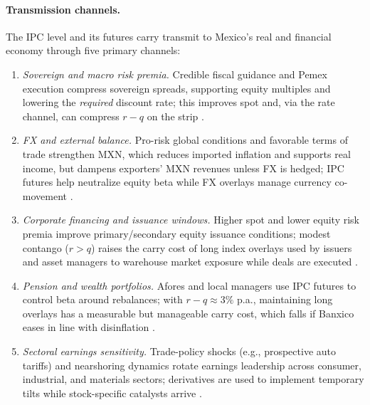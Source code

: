 \documentclass[11pt,a4paper]{article} %
\begin{document}
\paragraph{Transmission channels.}
The IPC level and its futures carry transmit to Mexico's real and financial economy through five primary channels:
\begin{enumerate}
  \item \textit{Sovereign and macro risk premia.} Credible fiscal guidance and Pemex execution compress sovereign spreads, supporting equity multiples and lowering the \emph{required} discount rate; this improves spot and, via the rate channel, can compress \(r-q\) on the strip \citep{reuters_budget_2025,reuters_pemex_plan_2025}.
  \item \textit{FX and external balance.} Pro-risk global conditions and favorable terms of trade strengthen MXN, which reduces imported inflation and supports real income, but dampens exporters' MXN revenues unless FX is hedged; IPC futures help neutralize equity beta while FX overlays manage currency co-movement \citep{reuters_usdmxn_quote}.
  \item \textit{Corporate financing and issuance windows.} Higher spot and lower equity risk premia improve primary/secondary equity issuance conditions; modest contango (\(r>q\)) raises the carry cost of long index overlays used by issuers and asset managers to warehouse market exposure while deals are executed \citep{spdj_ipc_page,spdj_bmv_methodology}.
  \item \textit{Pension and wealth portfolios.} Afores and local managers use IPC futures to control beta around rebalances; with \(r-q\approx 3\%\) p.a., maintaining long overlays has a measurable but manageable carry cost, which falls if Banxico eases in line with disinflation \citep{bloomberg_mx_inflation_2025,mnd_inflation_band_2025}.
  \item \textit{Sectoral earnings sensitivity.} Trade-policy shocks (e.g., prospective auto tariffs) and nearshoring dynamics rotate earnings leadership across consumer, industrial, and materials sectors; derivatives are used to implement temporary tilts while stock-specific catalysts arrive \citep{reuters_tariffs_china_autos_2025,reuters_border_jobs_2025}.
\end{enumerate}
\end{document}
